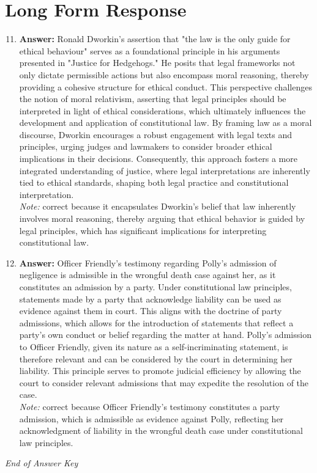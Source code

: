 \documentclass[12pt]{article}
\begin{document}
\section*{Long Form Response}
\begin{enumerate}[label=\arabic*.]
\setcounter{enumi}{10}
\item \textbf{Answer:} Ronald Dworkin's assertion that "the law is the only guide for ethical behaviour" serves as a foundational principle in his arguments presented in "Justice for Hedgehogs." He posits that legal frameworks not only dictate permissible actions but also encompass moral reasoning, thereby providing a cohesive structure for ethical conduct. This perspective challenges the notion of moral relativism, asserting that legal principles should be interpreted in light of ethical considerations, which ultimately influences the development and application of constitutional law. By framing law as a moral discourse, Dworkin encourages a robust engagement with legal texts and principles, urging judges and lawmakers to consider broader ethical implications in their decisions. Consequently, this approach fosters a more integrated understanding of justice, where legal interpretations are inherently tied to ethical standards, shaping both legal practice and constitutional interpretation.
\\ \textit{Note:} correct because it encapsulates Dworkin's belief that law inherently involves moral reasoning, thereby arguing that ethical behavior is guided by legal principles, which has significant implications for interpreting constitutional law.
\item \textbf{Answer:} Officer Friendly's testimony regarding Polly's admission of negligence is admissible in the wrongful death case against her, as it constitutes an admission by a party. Under constitutional law principles, statements made by a party that acknowledge liability can be used as evidence against them in court. This aligns with the doctrine of party admissions, which allows for the introduction of statements that reflect a party's own conduct or belief regarding the matter at hand. Polly's admission to Officer Friendly, given its nature as a self-incriminating statement, is therefore relevant and can be considered by the court in determining her liability. This principle serves to promote judicial efficiency by allowing the court to consider relevant admissions that may expedite the resolution of the case.
\\ \textit{Note:} correct because Officer Friendly's testimony constitutes a party admission, which is admissible as evidence against Polly, reflecting her acknowledgment of liability in the wrongful death case under constitutional law principles.
\end{enumerate}

\vfill
\noindent\textit{End of Answer Key}
\end{document}

